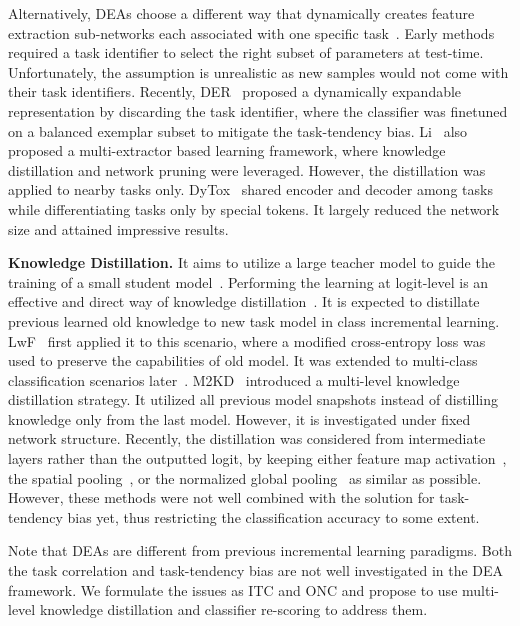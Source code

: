 \documentclass[letterpaper]{article} \usepackage{aaai23}  \usepackage{times}  \usepackage{helvet}  \usepackage{courier}  \usepackage[hyphens]{url}  \usepackage{graphicx} \urlstyle{rm} \def\UrlFont{\rm}  \usepackage{natbib}  \usepackage{caption} \frenchspacing  \setlength{\pdfpagewidth}{8.5in}  \setlength{\pdfpageheight}{11in}  \usepackage{algorithm}
\begin{document}
Alternatively, DEAs choose a different way that dynamically creates feature extraction sub-networks each associated with one specific task~\cite{t23, t27, t33, t56, t11, t67}. Early methods required a task identifier to select the right subset of parameters at test-time. Unfortunately, the assumption is unrealistic as new samples would not come with their task identifiers. Recently, DER~\cite{t70} proposed a dynamically expandable representation by discarding the task identifier, where the classifier was finetuned on a balanced exemplar subset to mitigate the task-tendency bias. Li~\cite{t47} also proposed a multi-extractor based learning framework, where knowledge distillation and network pruning were leveraged. However, the distillation was applied to nearby tasks only. DyTox~\cite{t0} shared encoder and decoder among tasks while differentiating tasks only by special tokens. It largely reduced the network size and attained impressive results. 


\noindent\textbf{Knowledge Distillation.}
It aims to utilize a large teacher model to guide the training of a small student model~\cite{r9,yang2022multi,yang2022rd}. Performing the learning at logit-level is an effective and direct way of knowledge distillation~\cite{e14}. It is expected to distillate previous learned old knowledge to new task model in class incremental learning. LwF~\cite{w20} first applied it to this scenario, where a modified cross-entropy loss was used to preserve the capabilities of old model. It was extended to multi-class classification scenarios later~\cite{t54}. M2KD~\cite{w39} introduced a multi-level knowledge distillation strategy. It utilized all previous model snapshots instead of distilling knowledge only from the last model. However, it is investigated under fixed network structure. Recently, the distillation was considered from intermediate layers rather than the outputted logit, by keeping either feature map activation~\cite{p24}, the spatial pooling~\cite{t19}, or the normalized global pooling~\cite{t32} as similar as possible. However, these methods were not well combined with the solution for task-tendency bias yet, thus restricting the classification accuracy to some extent. 

Note that DEAs are different from previous incremental learning paradigms. Both the task correlation and task-tendency bias are not well investigated in the DEA framework. We formulate the issues as ITC and ONC and propose to use multi-level knowledge distillation and classifier re-scoring to address them.
\end{document}
